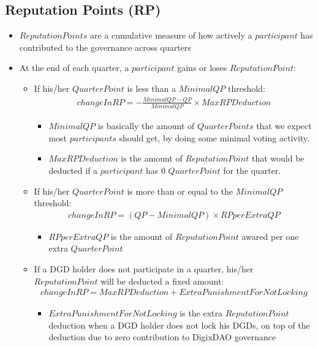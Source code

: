 \documentclass[11pt,a4paper,titlepage]{article}
\begin{document}
{	\subsection{Reputation Points (RP)}{
		\begin{itemize}
			\item $Reputation Points$ are a cumulative measure of how actively a $participant$ has contributed to the governance across quarters
			\item At the end of each quarter, a $participant$ gains or loses $Reputation Point$:
			\begin{itemize}
				\item If his/her $Quarter Point$ is less than a $Minimal QP$ threshold:
				\begin{align*}
					change In RP = -\frac{Minimal QP - QP}{Minimal QP} \times MaxRPDeduction
				\end{align*}
				\begin{itemize}
					\item $MinimalQP$ is basically the amount of $QuarterPoints$ that we expect most $participants$ should get, by doing some minimal voting activity.
					\item $MaxRPDeduction$ is the amount of $Reputation Point$ that would be deducted if a $participant$ has 0 $QuarterPoint$ for the quarter.
				\end{itemize}
				\item If his/her $Quarter Point$ is more than or equal to the $Minimal QP$ threshold:
				\begin{align*}
					changeInRP = (QP-MinimalQP) \times RPperExtraQP
				\end{align*}
				\begin{itemize}
					\item $RPperExtraQP$ is the amount of $ReputationPoint$ awared per one extra $QuarterPoint$
				\end{itemize}
				\item If a DGD holder does not participate in a quarter, his/her $Reputation Point$ will be deducted a fixed amount:
				\begin{align*}
					changeInRP = MaxRPDeduction + ExtraPunishmentForNotLocking
				\end{align*}
				\begin{itemize}
					\item $ExtraPunishmentForNotLocking$ is the extra $ReputationPoint$ deduction when a DGD holder does not lock his DGDs, on top of the deduction due to zero contribution to DigixDAO governance
				\end{itemize}
			\end{itemize}


\end{itemize}}}
\end{document}
